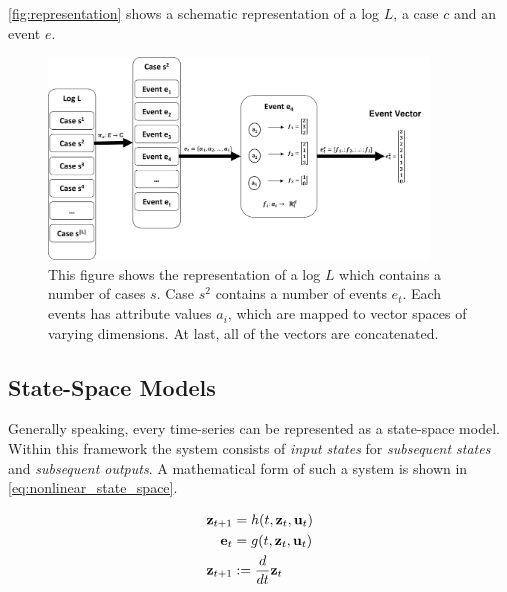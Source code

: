 \documentclass[./../../paper.tex]{subfiles}
\begin{document}
\autoref{fig:representation} shows a schematic representation of a log $L$, a case $c$ and an event $e$.


\begin{figure}[htbp]
    \centering
    \includegraphics[width=0.9\textwidth]{figures/Graphics/Slide4.PNG}
    \caption{This figure shows the representation of a log $L$ which contains a number of cases $s$. Case $s^2$ contains a number of events $e_t$. Each events has attribute values $a_i$, which are mapped to vector spaces of varying dimensions. At last, all of the vectors are concatenated.}
    \label{fig:representation}
\end{figure}




\subsection{State-Space Models}
Generally speaking, every time-series can be represented as a state-space model\autocite{kalman_NewApproachLinear_1960}. Within this framework the system consists of \emph{input states} for \emph{subsequent states} and \emph{subsequent outputs}. A mathematical form of such a system is shown in \autoref{eq:nonlinear_state_space}.

\begin{align}
    \label{eq:nonlinear_state_space}
    \mathbf{z}_{t+1} & =h(t, \mathbf{z}_t, \mathbf{u}_t)           \\
    \mathbf{e}_t   & =g(t, \mathbf{z}_t, \mathbf{u}_t) \nonumber \\
    \mathbf{z}_{t+1} &:=\frac{d}{d t} \mathbf{z}_t \nonumber
\end{align}
\end{document}
